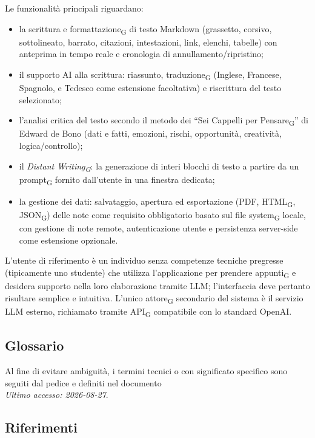 Le funzionalità principali riguardano:
\begin{itemize}
	\item la scrittura e formattazione\textsubscript{G} di testo Markdown (grassetto, corsivo, sottolineato, barrato, citazioni, intestazioni, link, elenchi, tabelle) con anteprima in tempo reale e cronologia di annullamento/ripristino;
	\item il supporto AI alla scrittura: riassunto, traduzione\textsubscript{G} (Inglese, Francese, Spagnolo, e Tedesco come estensione facoltativa) e riscrittura del testo selezionato;
	\item l'analisi critica del testo secondo il metodo dei ``Sei Cappelli per Pensare\textsubscript{G}'' di Edward de Bono (dati e fatti, emozioni, rischi, opportunità, creatività, logica/controllo);
	\item il \textit{Distant Writing\textsubscript{G}}: la generazione di interi blocchi di testo a partire da un prompt\textsubscript{G} fornito dall'utente in una finestra dedicata;
	\item la gestione dei dati: salvataggio, apertura ed esportazione (PDF, HTML\textsubscript{G}, JSON\textsubscript{G}) delle note come requisito obbligatorio basato sul file system\textsubscript{G} locale, con gestione di note remote, autenticazione utente e persistenza server-side come estensione opzionale.
\end{itemize}

L'utente di riferimento è un individuo senza competenze tecniche pregresse (tipicamente uno studente) che utilizza l'applicazione per prendere appunti\textsubscript{G} e desidera supporto nella loro elaborazione tramite LLM; l'interfaccia deve pertanto risultare semplice e intuitiva. L'unico attore\textsubscript{G} secondario del sistema è il servizio LLM esterno, richiamato tramite API\textsubscript{G} compatibile con lo standard OpenAI.

\subsection{Glossario}
Al fine di evitare ambiguità, i termini tecnici o con significato specifico sono seguiti dal pedice e definiti nel documento  \\
\textit{Ultimo accesso: 2026-08-27}.

\subsection{Riferimenti}

